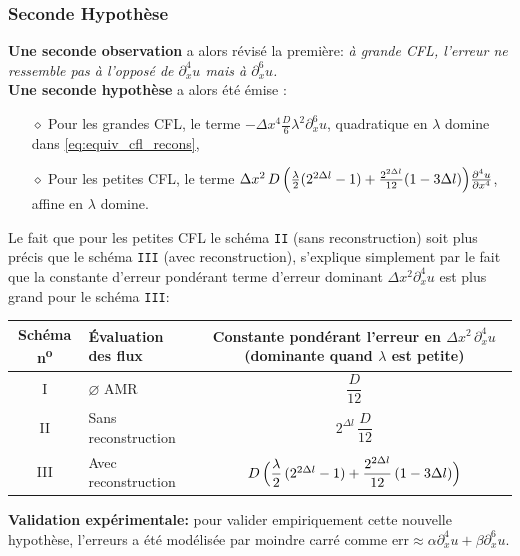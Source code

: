 \subsubsection{Seconde Hypothèse}
\textbf{Une seconde observation} a alors révisé la première: \textit{à grande CFL, l'erreur ne ressemble pas à l'opposé de $\partial_x^4 u$ mais à 
$\partial_x^6 u$.}\\
\textbf{Une seconde hypothèse} a alors été émise :
    \begin{itemize}
        \item[$\diamond$] Pour les grandes CFL, le terme $- \Delta x^4 \frac{D}{6} \lambda^2 \partial_x^6 u$, quadratique en $\lambda$ domine dans \eqref{eq:equiv_cfl_recons},
        \item[$\diamond$] Pour les petites CFL, le terme $\Delta x^{2}\, D \, \Bigl(\frac{\lambda}{2} (2^{2 \Delta l} - 1) + \frac{2^{2 \Delta l} }{12} (1 - 3 \Delta l)\Bigr)\frac{\partial^{4}u}{\partial x^{4}}$, affine en $\lambda$ domine.
    \end{itemize}
    Le fait que pour les petites CFL le schéma \texttt{II} (sans reconstruction) soit plus précis que le schéma \texttt{III} (avec reconstruction),
    s'explique simplement par le fait que la constante d'erreur pondérant terme d'erreur dominant $\Delta x^2 \partial_x^4 u$ est plus grand pour le schéma \texttt{III}:
\begin{center}
    \renewcommand{\arraystretch}{1}
    \begin{tabular}{@{}clc@{}}
        \toprule
        \textbf{Schéma n\textsuperscript{o}} & \textbf{Évaluation des flux} &
        \makecell[c]{\textbf{Constante pondérant l'erreur en $\Delta x^{2}\,\partial_{x}^{4}u$}\\
                    \textbf{(dominante quand $\lambda$ est petite)}} \\
        \midrule
        I   & $\varnothing$ AMR          & $\dfrac{D}{12}$ \\[1mm]
        II  & Sans reconstruction         & $2^{\Delta l}\,\dfrac{D}{12}$ \\[1mm]
        III & Avec reconstruction         &
            $D\,\Bigl(\dfrac{\lambda}{2}\,(2^{2\Delta l}-1)
            + \dfrac{2^{2\Delta l}}{12}\,(1-3\Delta l)\Bigr)$ \\[1mm]
        \bottomrule
    \end{tabular}
\end{center}
\textbf{Validation expérimentale: } pour valider empiriquement cette nouvelle hypothèse, l'erreurs a été modélisée par moindre carré comme $\text{err} \approx \alpha \partial_x^4 u + \beta \partial_x^6u$. 
